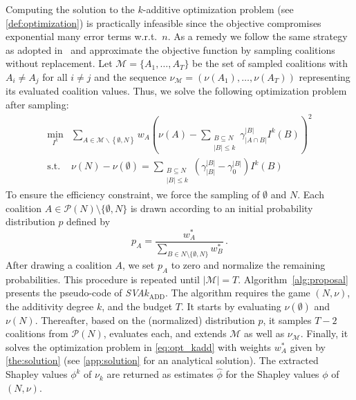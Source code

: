 Computing the solution to the $k$-additive optimization problem (see \cref{def:optimization}) is practically infeasible since the objective compromises exponential many error terms w.r.t.\ $n$.
As a remedy we follow the same strategy as adopted in~\citep{Lundberg.2017,Pelegrina.2023} and approximate the objective function by sampling coalitions without replacement.
Let $\mathcal{M} = \{A_1,\ldots,A_T\}$ be the set of sampled coalitions with $A_i \neq A_j$ for all $i \neq j$ and the sequence $\nu_{\mathcal{M}} = (\nu(A_1),\ldots,\nu(A_T))$ representing its evaluated coalition values.
Thus, we solve the following optimization problem after sampling:
\begin{equation}
\label{eq:opt_kadd}
\begin{array}{rl}
\displaystyle\min_{I^k} & \sum\limits_{A \in \mathcal{M}\backslash \left\{\emptyset, N \right\}} w_{A} \left( \nu(A) - \sum\limits_{\substack{B \subseteq N \\ |B| \leq k}} \gamma^{\left|B \right|}_{\left| A \cap B \right|}I^k(B) \right)^2 \\
 \text{s.t.} & \nu(N) - \nu(\emptyset) = \sum\limits_{\substack{B \subseteq N \\ |B| \leq k}} \left( \gamma^{\left|B \right|}_{\left| B \right|} - \gamma^{\left|B \right|}_0 \right) I^k(B)
\end{array}
\end{equation}
To ensure the efficiency constraint, we force the sampling of $\emptyset$ and $N$.
Each coalition $A \in \mathcal{P}(N) \setminus \{\emptyset, N\}$ is drawn according to an initial probability distribution $p$ defined by
\begin{equation}
    p_A = \frac{w_A^*}{\sum\nolimits_{B \in N \setminus \{\emptyset, N\}} w_B^*} \, .
\end{equation}
After drawing a coalition $A$, we set $p_A$ to zero and normalize the remaining probabilities.
This procedure is repeated until $\left| \mathcal{M} \right| = T$. 
Algorithm~\ref{alg:proposal} presents the pseudo-code of \emph{SVA}$k_{\text{ADD}}$.
The algorithm requires the game $(N,\nu)$, the additivity degree $k$, and the budget $T$.
It starts by evaluating $\nu(\emptyset)$ and $\nu(N)$.
Thereafter, based on the (normalized) distribution $p$, it samples $T-2$ coalitions from $\mathcal{P}(N)$, evaluates each, and extends $\mathcal{M}$ as well as $\nu_{\mathcal{M}}$.
Finally, it solves the optimization problem in \cref{eq:opt_kadd} with weights $w_A^*$ given by \cref{the:solution} (see \cref{app:solution} for an analytical solution).
The extracted Shapley values $\phi^k$ of $\nu_k$ are returned as estimates $\hat\phi$ for the Shapley values $\phi$ of $(N,\nu)$.

